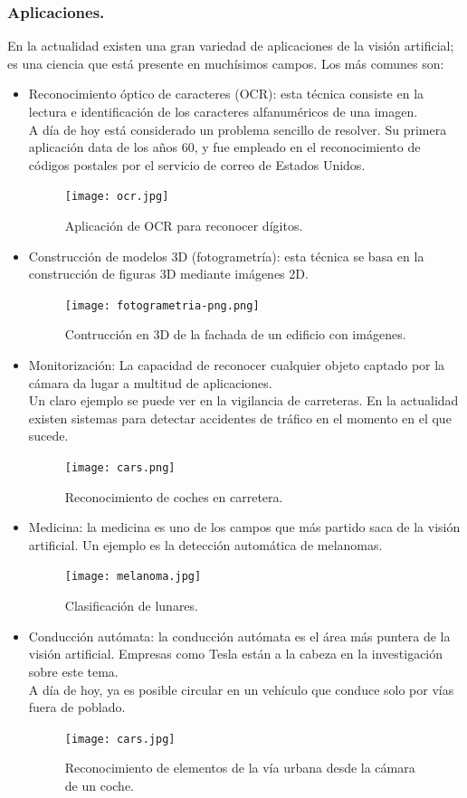 \documentclass[a4paper,11pt]{article}
\begin{document}
\subsubsection{Aplicaciones.}
En la actualidad existen una gran variedad de aplicaciones de la visión artificial; es una ciencia que está presente en muchísimos campos. Los más comunes son:
\begin{itemize}
\item Reconocimiento óptico de caracteres (OCR): esta técnica consiste en la lectura e identificación de los caracteres alfanuméricos de una imagen.\\ 
\noindent
A día de hoy está considerado un problema sencillo de resolver. Su primera aplicación data de los años 60, y fue empleado en el reconocimiento de códigos postales por el servicio de correo de Estados Unidos.
\begin{figure}[H]
\centering
\texttt{[image: ocr.jpg]}
\caption{Aplicación de OCR para reconocer dígitos.}
\end{figure}
\item Construcción de modelos 3D (fotogrametría): esta técnica se basa en la construcción de figuras 3D mediante imágenes 2D.
\begin{figure}[H]
\centering
\texttt{[image: fotogrametria-png.png]}
\caption{Contrucción en 3D de la fachada de un edificio con imágenes.}
\end{figure}
\item Monitorización: La capacidad de reconocer cualquier objeto captado por la cámara da lugar a multitud de aplicaciones. \\
\noindent
Un claro ejemplo se puede ver en la vigilancia de carreteras. En la actualidad existen sistemas para detectar accidentes de tráfico en el momento en el que sucede.
\begin{figure}[H]
\centering
\texttt{[image: cars.png]}
\caption{Reconocimiento de coches en carretera.}
\end{figure}
\item Medicina: la medicina es uno de los campos que más partido saca de la visión artificial. Un ejemplo es la detección automática de melanomas.
\begin{figure}[H]
\centering
\texttt{[image: melanoma.jpg]}
\caption{Clasificación de lunares.}
\end{figure}
\item Conducción autómata: la conducción autómata es el área más puntera de la visión artificial. Empresas como Tesla están a la cabeza en la investigación sobre este tema. \\
\noindent
A día de hoy, ya es posible circular en un vehículo que conduce solo por vías fuera de poblado.
\begin{figure}[H]
\centering
\texttt{[image: cars.jpg]}
\caption{Reconocimiento de elementos de la vía urbana desde la cámara de un coche.}
\end{figure}
\end{itemize}
\end{document}
